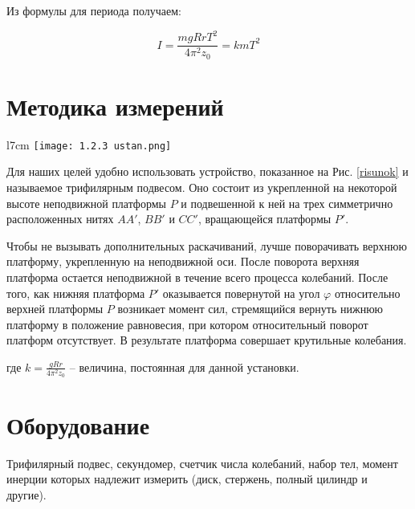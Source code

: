 \documentclass[a4, 12pt]{article}
\begin{document}
	Из формулы для периода получаем:

	\begin{equation}\label{momin}
		I = \frac{mgRrT^2}{4 \pi^2z_0} = kmT^2
	\end{equation}

	\section {Методика измерений}

	\begin{wrapfigure}{l}{7cm}
		\texttt{[image: 1.2.3 ustan.png]}
		\caption{Физический маятник}\label{risunok}
	\end{wrapfigure}

	Для наших целей удобно использовать устройство, показанное на Рис. \ref{risunok} и называемое трифилярным подвесом. Оно состоит из укрепленной на некоторой высоте неподвижной платформы $P$ и подвешенной к ней на трех симметрично расположенных нитях $AA'$, $BB'$ и $CC'$, вращающейся платформы $P'$.

	Чтобы не вызывать дополнительных раскачиваний, лучше поворачивать верхнюю платформу, укрепленную на неподвижной оси. После поворота верхняя платформа остается неподвижной в течение всего процесса колебаний. После того, как нижняя платформа $P'$ оказывается повернутой на угол $\varphi$ относительно верхней платформы $P$ возникает момент сил, стремящийся вернуть нижнюю платформу в положение равновесия, при котором относительный поворот платформ отсутствует. В результате платформа совершает крутильные колебания.

	\noindent где $k = \frac{gRr}{4\pi^2z_0}$ -- величина, постоянная для данной установки.

	\section{Оборудование}
	Трифилярный подвес, секундомер, счетчик числа колебаний, набор тел, момент инерции которых надлежит измерить (диск, стержень, полный цилиндр и другие).
\end{document}
